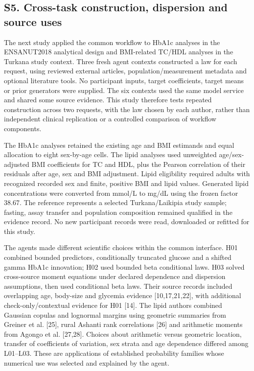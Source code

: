 \documentclass[sigconf,anonymous,review]{acmart}
\begin{document}
\subsection*{S5. Cross-task construction, dispersion and source uses}

The next study applied the common workflow to HbA1c analyses in the ENSANUT2018 analytical design and BMI-related TC/\allowbreak{}HDL analyses in the Turkana study context. Three fresh agent contexts constructed a law for each request, using reviewed external articles, population/\allowbreak{}measurement metadata and optional literature tools. No participant inputs, target coefficients, target means or prior generators were supplied. The six contexts used the same model service and shared some source evidence. This study therefore tests repeated construction across two requests, with the law chosen by each author, rather than independent clinical replication or a controlled comparison of workflow components.


The HbA1c analyses retained the existing age and BMI estimands and equal allocation to eight sex-by-age cells. The lipid analyses used unweighted age/\allowbreak{}sex-adjusted BMI coefficients for TC and HDL, plus the Pearson correlation of their residuals after age, sex and BMI adjustment. Lipid eligibility required adults with recognized recorded sex and finite, positive BMI and lipid values. Generated lipid concentrations were converted from mmol/\allowbreak{}L to mg/\allowbreak{}dL using the frozen factor 38.67. The reference represents a selected Turkana/\allowbreak{}Laikipia study sample; fasting, assay transfer and population composition remained qualified in the evidence record. No new participant records were read, downloaded or refitted for this study.


The agents made different scientific choices within the common interface. H01 combined bounded predictors, conditionally truncated glucose and a shifted gamma HbA1c innovation; H02 used bounded beta conditional laws. H03 solved cross-source moment equations under declared dependence and dispersion assumptions, then used conditional beta laws. Their source records included overlapping age, body-size and glycemia evidence [10,17,21,22], with additional check-only/\allowbreak{}contextual evidence for H01 [14]. The lipid authors combined Gaussian copulas and lognormal margins using geometric summaries from Greiner et al. [25], rural Ashanti rank correlations [26] and arithmetic moments from Agongo et al. [27,28]. Choices about arithmetic versus geometric location, transfer of coefficients of variation, sex strata and age dependence differed among L01–\allowbreak{}L03. These are applications of established probability families whose numerical use was selected and explained by the agent.
\end{document}
